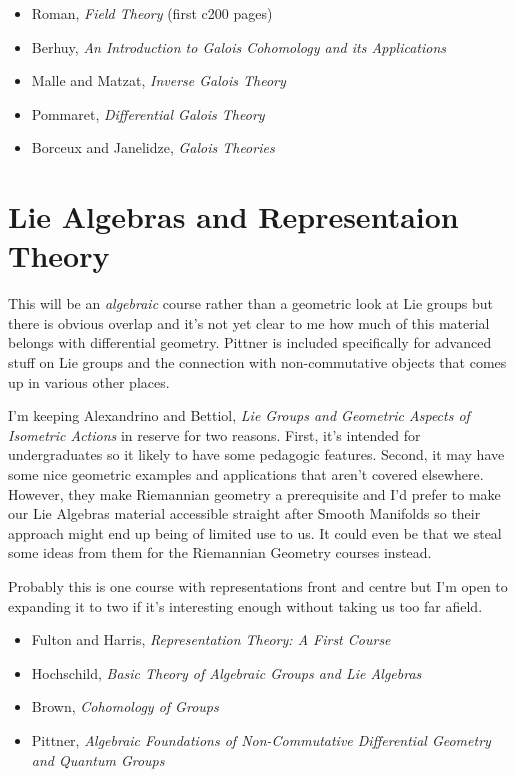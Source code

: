 \documentclass[article]{article}
\begin{document}
\begin{itemize}
	\item[]{Roman, \textit{Field Theory} (first c200 pages)}
	\item[]{Berhuy, \textit{An Introduction to Galois Cohomology and its Applications}}
	\item[]{Malle and Matzat, \textit{Inverse Galois Theory}}
	\item[]{Pommaret, \textit{Differential Galois Theory}}
	\item[]{Borceux and Janelidze, \textit{Galois Theories}}
\end{itemize}

\section{Lie Algebras and Representaion Theory}

This will be an \textit{algebraic} course rather than a geometric look at Lie groups but there is obvious overlap and it's not yet clear to me how much of this material belongs with differential geometry. Pittner is included specifically for advanced stuff on Lie groups and the connection with non-commutative objects that comes up in various other places.

I'm keeping Alexandrino and Bettiol, \textit{Lie Groups and Geometric Aspects of Isometric Actions} in reserve for two reasons. First, it's intended for undergraduates so it likely to have some pedagogic features. Second, it may have some nice geometric examples and applications that aren't covered elsewhere. However, they make Riemannian geometry a prerequisite and I'd prefer to make our Lie Algebras material accessible straight after Smooth Manifolds so their approach might end up being of limited use to us. It could even be that we steal some ideas from them for the Riemannian Geometry courses instead.

Probably this is one course with representations front and centre but I'm open to expanding it to two if it's interesting enough without taking us too far afield.

\begin{itemize}
	\item[]{Fulton and Harris, \textit{Representation Theory: A First Course}}
	\item[]{Hochschild, \textit{Basic Theory of Algebraic Groups and Lie Algebras}}
	\item[]{Brown, \textit{Cohomology of Groups}}
	\item[]{Pittner, \textit{Algebraic Foundations of Non-Commutative Differential Geometry and Quantum Groups}}
\end{itemize}
\end{document}
